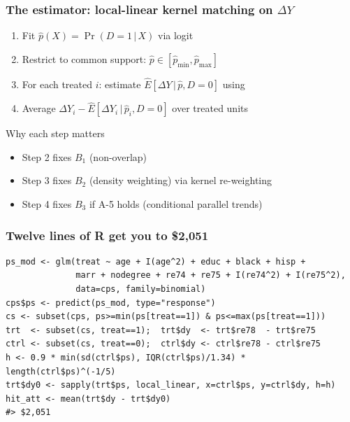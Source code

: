 \documentclass[10pt,aspectratio=169]{beamer}
\begin{document}
\begin{frame}
  \frametitle{The estimator: local-linear kernel matching on $\Delta Y$}
  \vspace{0.3cm}
  \begin{enumerate}
    \item Fit $\hat p(X) = \Pr(D{=}1\,|\,X)$ via logit
    \item Restrict to common support: $\hat p \in [\hat p_{\min}, \hat p_{\max}]$
    \item For each treated $i$: estimate $\widehat{E}[\Delta Y\,|\,\hat p, D{=}0]$
          using 
    \item Average $\Delta Y_i - \widehat{E}[\Delta Y_i\,|\,\hat p_i, D{=}0]$
          over treated units
  \end{enumerate}
  \vspace{0.5em}
  \begin{block}{Why each step matters}
    \begin{itemize}\setlength{\itemsep}{0pt}
      \item Step 2 fixes $B_1$ (non-overlap)
      \item Step 3 fixes $B_2$ (density weighting) via kernel re-weighting
      \item Step 4 fixes $B_3$ if A-5 holds (conditional parallel trends)
    \end{itemize}
  \end{block}
\end{frame}

\begin{frame}[fragile]
  \frametitle{Twelve lines of R get you to \$2{,}051}
\begin{lstlisting}
ps_mod <- glm(treat ~ age + I(age^2) + educ + black + hisp +
              marr + nodegree + re74 + re75 + I(re74^2) + I(re75^2),
              data=cps, family=binomial)
cps$ps <- predict(ps_mod, type="response")
cs <- subset(cps, ps>=min(ps[treat==1]) & ps<=max(ps[treat==1]))
trt  <- subset(cs, treat==1);  trt$dy  <- trt$re78  - trt$re75
ctrl <- subset(cs, treat==0);  ctrl$dy <- ctrl$re78 - ctrl$re75
h <- 0.9 * min(sd(ctrl$ps), IQR(ctrl$ps)/1.34) * length(ctrl$ps)^(-1/5)
trt$dy0 <- sapply(trt$ps, local_linear, x=ctrl$ps, y=ctrl$dy, h=h)
hit_att <- mean(trt$dy - trt$dy0)
#> $2,051
\end{lstlisting}
\end{frame}
\end{document}
